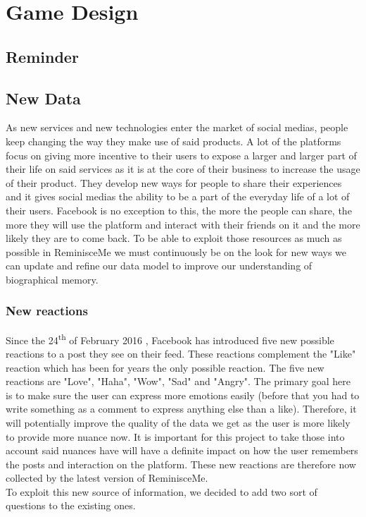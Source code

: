 \chapter{Game Design}
\section{Reminder}
\section{New Data}
As new services and new technologies enter the market of social medias, people keep changing the way they make use of said products. A lot of the platforms focus on giving more incentive to their users to expose a larger and larger part of their life on said services as it is at the core of their business to increase the usage of their product. They develop new ways for people to share their experiences and it gives social medias the ability to be a part of the everyday life of a lot of their users. Facebook is no exception to this, the more the people can share, the more they will use the platform and interact with their friends on it and the more likely they are to come back. To be able to exploit those resources as much as possible in ReminisceMe we must continuously be on the look for new ways we can update and refine our data model to improve our understanding of biographical memory.
\subsection{New reactions}
Since the 24\textsuperscript{th} of February 2016 \cite{reactrelease}, Facebook has introduced five new possible reactions to a post they see on their feed. These reactions complement the "Like" reaction which has been for years the only possible reaction. The five new reactions are "Love", "Haha", "Wow", "Sad" and "Angry". The primary goal here is to make sure the user can express more emotions easily (before that you had to write something as a comment to express anything else than  a like). Therefore, it will potentially improve the quality of the data we get as the user is more likely to provide more nuance now. It is important for this project to take those into account said nuances have will have a definite impact on how the user remembers the posts and interaction on the platform. These new reactions are therefore now collected by the latest version of ReminisceMe.\\
To exploit this new source of information, we decided to add two sort of questions to the existing ones.
